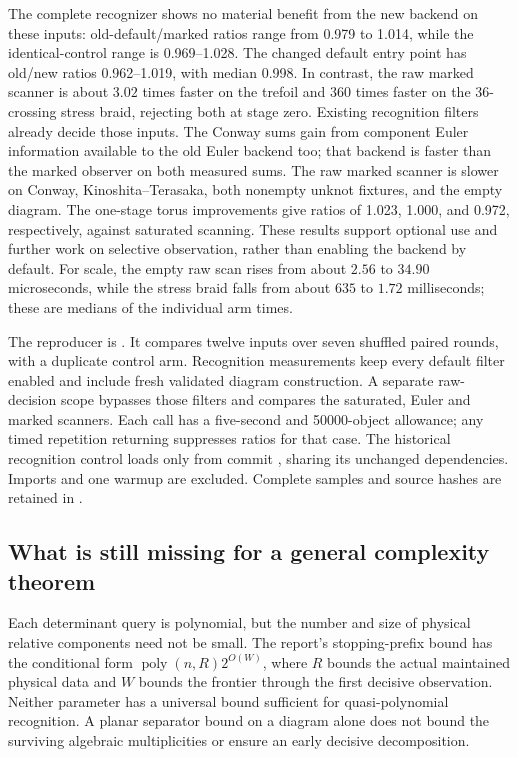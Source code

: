 

The complete recognizer shows no material benefit from the new backend
on these inputs: old-default/marked ratios range from 0.979 to 1.014,
while the identical-control range is 0.969--1.028.  The changed default
entry point has old/new ratios 0.962--1.019, with median 0.998.
In contrast, the raw marked scanner is about $3.02$ times faster on the
trefoil and $360$ times faster on the 36-crossing stress braid, rejecting
both at stage zero.  Existing recognition filters already decide those
inputs.  The Conway sums gain from component Euler information available
to the old Euler backend too; that backend is faster than the marked
observer on both measured sums.  The raw marked scanner is slower on
Conway, Kinoshita--Terasaka, both nonempty unknot fixtures, and the empty
diagram.  The one-stage torus improvements give ratios of 1.023, 1.000,
and 0.972, respectively, against saturated scanning.  These results
support optional use and further work on selective observation, rather
than enabling the backend by default.
For scale, the empty raw scan rises from about $2.56$ to $34.90$
microseconds, while the stress braid falls from about $635$ to $1.72$
milliseconds; these are medians of the individual arm times.

The reproducer is .  It compares twelve
inputs over seven shuffled paired rounds, with a duplicate control arm.
Recognition measurements keep every default filter enabled and include
fresh validated diagram construction.  A separate raw-decision scope
bypasses those filters and compares the saturated, Euler and marked
scanners.  Each call has a five-second and 50000-object allowance;
any timed repetition returning  suppresses ratios for
that case.  The historical recognition control loads only
 from commit , sharing its unchanged
dependencies.  Imports and one warmup are excluded.  Complete samples
and source hashes are retained in
.

\subsection{What is still missing for a general complexity theorem}

Each determinant query is polynomial, but the number and size of physical
relative components need not be small.  The report's stopping-prefix
bound has the conditional form $\operatorname{poly}(n,R)2^{O(W)}$,
where $R$ bounds the actual maintained physical data and $W$ bounds the
frontier through the first decisive observation.  Neither parameter
has a universal bound sufficient for quasi-polynomial recognition.
A planar separator bound on a diagram alone does not bound the surviving
algebraic multiplicities or ensure an early decisive decomposition.


